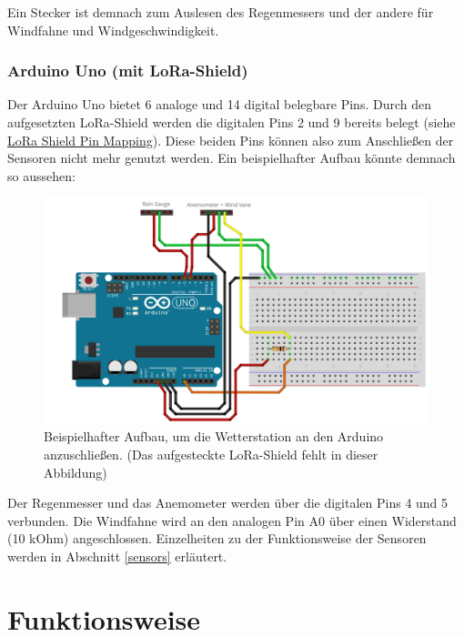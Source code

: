 \documentclass[12pt]{article}
\begin{document}
      Ein Stecker ist demnach zum Auslesen des Regenmessers und der andere für Windfahne und Windgeschwindigkeit.



      \subsubsection{Arduino Uno (mit LoRa-Shield)}
      Der Arduino Uno bietet 6 analoge und 14 digital belegbare Pins.
      Durch den aufgesetzten LoRa-Shield werden die digitalen Pins 2 und 9 bereits belegt (siehe \href{https://wiki.dragino.com/index.php?title=File:LoRa_Shield_Pin_Mapping.png}{LoRa Shield Pin Mapping}).
      Diese beiden Pins können also zum Anschließen der Sensoren nicht mehr genutzt werden.
      Ein beispielhafter Aufbau könnte demnach so aussehen:

      \begin{figure}[H]
        \centering
        \includegraphics[scale=0.2]{Arduino_Weather_Station_Diagram.png}
        \caption{Beispielhafter Aufbau, um die Wetterstation an den Arduino anzuschließen. (Das aufgesteckte LoRa-Shield fehlt in dieser Abbildung)}
      \end{figure}

      Der Regenmesser und das Anemometer werden über die digitalen Pins 4 und 5 verbunden.
      Die Windfahne wird an den analogen Pin A0 über einen Widerstand (10 kOhm) angeschlossen.
      Einzelheiten zu der Funktionsweise der Sensoren werden in Abschnitt \underline{\ref{sensors}} erläutert.



  \section{Funktionsweise}
\end{document}
